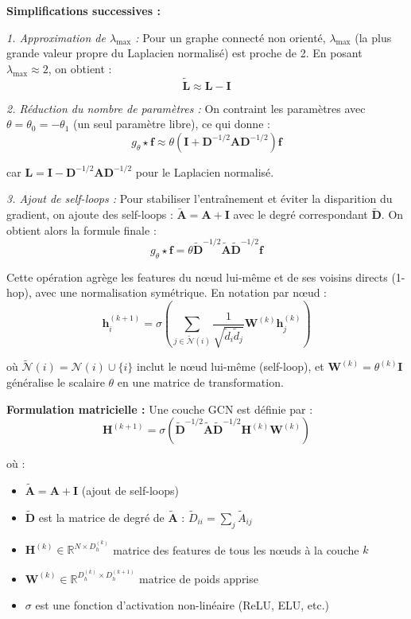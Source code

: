 \textbf{Simplifications successives :}

\textit{1. Approximation de $\lambda_{\max}$ :}
Pour un graphe connecté non orienté, $\lambda_{\max}$ (la plus grande valeur propre du Laplacien normalisé) est proche de 2. En posant $\lambda_{\max} \approx 2$, on obtient :
\[
\tilde{\mathbf{L}} \approx \mathbf{L} - \mathbf{I}
\]

\textit{2. Réduction du nombre de paramètres :}
On contraint les paramètres avec $\theta = \theta_0 = -\theta_1$ (un seul paramètre libre), ce qui donne :
\[
g_\theta \star \mathbf{f} \approx \theta(\mathbf{I} + \mathbf{D}^{-1/2}\mathbf{A}\mathbf{D}^{-1/2}) \mathbf{f}
\]

car $\mathbf{L} = \mathbf{I} - \mathbf{D}^{-1/2}\mathbf{A}\mathbf{D}^{-1/2}$ pour le Laplacien normalisé.

\textit{3. Ajout de self-loops :}
Pour stabiliser l'entraînement et éviter la disparition du gradient, on ajoute des self-loops : $\tilde{\mathbf{A}} = \mathbf{A} + \mathbf{I}$ avec le degré correspondant $\tilde{\mathbf{D}}$. On obtient alors la formule finale :
\[
g_\theta \star \mathbf{f} = \theta \tilde{\mathbf{D}}^{-1/2}\tilde{\mathbf{A}}\tilde{\mathbf{D}}^{-1/2} \mathbf{f}
\]

Cette opération agrège les features du nœud lui-même et de ses voisins directs (1-hop), avec une normalisation symétrique. En notation par nœud :
\[
\mathbf{h}_i^{(k+1)} = \sigma\left(\sum_{j \in \tilde{\mathcal{N}}(i)} \frac{1}{\sqrt{\tilde{d}_i \tilde{d}_j}} \mathbf{W}^{(k)}\mathbf{h}_j^{(k)}\right)
\]

où $\tilde{\mathcal{N}}(i) = \mathcal{N}(i) \cup \{i\}$ inclut le nœud lui-même (self-loop), et $\mathbf{W}^{(k)} = \theta^{(k)} \mathbf{I}$ généralise le scalaire $\theta$ en une matrice de transformation.

\textbf{Formulation matricielle :}
Une couche GCN est définie par :
\[
\mathbf{H}^{(k+1)} = \sigma\left(\tilde{\mathbf{D}}^{-1/2}\tilde{\mathbf{A}}\tilde{\mathbf{D}}^{-1/2}\mathbf{H}^{(k)}\mathbf{W}^{(k)}\right)
\]

où :
\begin{itemize}
    \item $\tilde{\mathbf{A}} = \mathbf{A} + \mathbf{I}$ (ajout de self-loops)
    \item $\tilde{\mathbf{D}}$ est la matrice de degré de $\tilde{\mathbf{A}}$ : $\tilde{D}_{ii} = \sum_j \tilde{A}_{ij}$
    \item $\mathbf{H}^{(k)} \in \mathbb{R}^{N \times D_h^{(k)}}$ matrice des features de tous les nœuds à la couche $k$
    \item $\mathbf{W}^{(k)} \in \mathbb{R}^{D_h^{(k)} \times D_h^{(k+1)}}$ matrice de poids apprise
    \item $\sigma$ est une fonction d'activation non-linéaire (ReLU, ELU, etc.)
\end{itemize}


